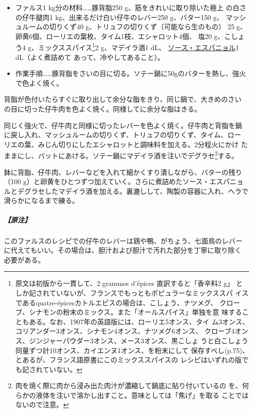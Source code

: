 \begin{recette}
\begin{itemize}
\item
  ファルス1 kg分の材料\ldots{}\ldots{}豚背脂250
  g、筋をきれいに取り除いた極上 の白さの仔牛腿肉1
  kg、出来るだけ白い仔牛のレバー250 g、バター150 g、
  マッシュルームの切りくず40 g、トリュフの切りくず（可能なら生のもの）
  25 g、卵黄6個、ローリエの葉\undemi{}枚、タイム1枝、エシャロット4個、
  塩20 g、こしょう4 g、ミックススパイス\footnote{原文は初版から一貫して、2
    grammes d'épices 直訳すると「香辛料2 g」
    としか記されていないが、フランスでもっともポピュラーなミックススパ
    イスであるquatre-épicesカトルエピスの場合は、こしょう、ナツメグ、
    クローブ、シナモンの粉末のミックス。また「オールスパイス」単独を意
    味することもある。なお、1907年の英語版には、ローリエ5オンス、タイ
    ム3オンス、コリアンダー3オンス、シナモン4オンス、ナツメグ6オンス、
    クローブ4オンス、ジンジャーパウダー3オンス、メース3オンス、黒こしょ
    うと白こしょう同量ずつ計10オンス、カイエンヌ1オンス、を粉末にして
    保存すべし(p.75)、とあるが、フランス語原書にこのミックススパイスの
    レシピはいずれの版でも記されていない。}2 g、マデイラ酒1\undemi{}
  dL、
  \protect\hyperlink{sauce-espagnole}{ソース・エスパニョル}1\undemi{}
  dL（よく煮詰めて あって、冷やしてあること）。
\item
  作業手順\ldots{}\ldots{}豚背脂をさいの目に切る。ソテー鍋に50gのバターを熱し、強火で色よく焼く。
\end{itemize}

背脂が色付いたらすぐに取り出して余分な脂をきり、同じ鍋で、大きめのさい
の目に切った仔牛肉を色よく焼く。同様してに余分な脂はきる。

同じく強火で、仔牛肉と同様に切ったレバーを色よく焼く。仔牛肉と背脂を鍋
に戻し入れ、マッシュルームの切りくず、トリュフの切りくず、タイム、ロー
リエの葉、みじん切りにしたエシャロットと調味料を加える。2分程火にかけ
たままにし、バットにあける。ソテー鍋にマデイラ酒を注いでデグラセ\footnote{肉を焼く際に肉から浸み出た肉汁が濃縮して鍋底に貼り付いているの
  を、何らかの液体を注いで溶かし出すこと。意味としては「焦げ」を取る
  ことではないので注意。}する。

鉢に背脂、仔牛肉、レバーなどを入れて細かくすり潰しながら、バターの残り
（100 g）と卵黄をひとつずつ加えていく。さらに煮詰めたソース・エスパニョ
ルとデグラセしたマデイラ酒を加える。裏漉しして、陶製の容器に入れ、ヘラで
滑らかになるまで練る。

\hypertarget{nota-farce-gratin-a}{%
\subparagraph{【原注】}\label{nota-farce-gratin-a}}

このファルスのレシピでの仔牛のレバーは鶏や鴨、がちょう、七面鳥のレバー
に代えてもいい。その場合は、胆汁および胆汁で汚れた部分を丁寧に取り除く
必要がある。


\end{recette}
